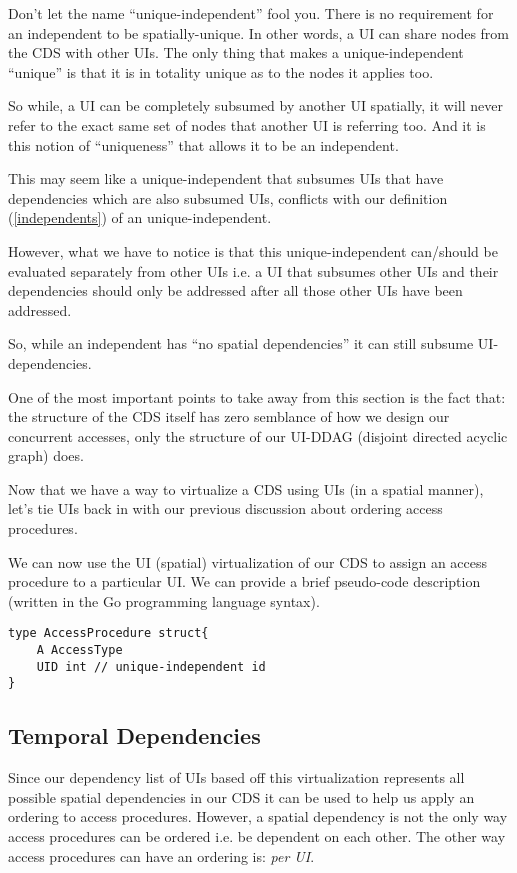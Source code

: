Don't let the name ``unique-independent'' fool you. There is no requirement for an independent to be spatially-unique. In other words, a UI can share nodes from the CDS with other UIs. The only thing that makes a unique-independent ``unique'' is that it is in totality unique as to the nodes it applies too. 

So while, a UI can be completely subsumed by another UI spatially, it will never refer to the exact same set of nodes that another UI is referring too. And it is this notion of ``uniqueness'' that allows it to be an independent.

This may seem like a unique-independent that subsumes UIs that have dependencies which are also subsumed UIs, conflicts with our definition (\ref{independents}) of an unique-independent.

However, what we have to notice is that this unique-independent can/should be evaluated separately from other UIs i.e. a UI that subsumes other UIs and their dependencies should only be addressed after all those other UIs have been addressed.

So, while an independent has ``no spatial dependencies'' it can still subsume UI-dependencies. 

One of the most important points to take away from this section is the fact that: the structure of the CDS itself has zero semblance of how we design our concurrent accesses, only the structure of our UI-DDAG (disjoint directed acyclic graph) does.

Now that we have a way to virtualize a CDS using UIs (in a spatial manner), let's tie UIs back in with our previous discussion about ordering access procedures.

We can now use the UI (spatial) virtualization of our CDS to assign an access procedure to a particular UI. We can provide a brief pseudo-code description (written in the Go programming language syntax).

\begin{verbatim}
type AccessProcedure struct{
	A AccessType
	UID int // unique-independent id
}
\end{verbatim}

\subsection{Temporal Dependencies}

Since our dependency list of UIs based off this virtualization represents all possible spatial dependencies in our CDS it can be used to help us apply an ordering to access procedures. However, a spatial dependency is not the only way access procedures can be ordered i.e. be dependent on each other. The other way access procedures can have an ordering is: \textit{per UI}.

